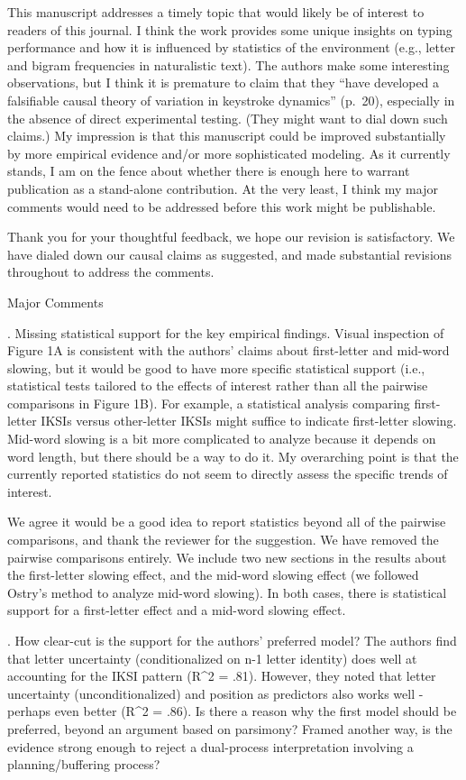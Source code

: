 \documentclass[draft]{article}
\begin{document}
\RC This manuscript addresses a timely topic that would likely be of interest to readers of this journal. I think the work provides some unique insights on typing performance and how it is influenced by statistics of the environment (e.g., letter and bigram frequencies in naturalistic text). The authors make some interesting observations, but I think it is premature to claim that they ``have developed a falsifiable causal theory of variation in keystroke dynamics'' (p.~20), especially in the absence of direct experimental testing. (They might want to dial down such claims.) My impression is that this manuscript could be improved substantially by more empirical evidence and/or more sophisticated modeling. As it currently stands, I am on the fence about whether there is enough here to warrant publication as a stand-alone contribution. At the very least, I think my major comments would need to be addressed before this work might be publishable.

Thank you for your thoughtful feedback, we hope our revision is satisfactory. We have dialed down our causal claims as suggested, and made substantial revisions throughout to address the comments.

Major Comments

. Missing statistical support for the key empirical findings. Visual inspection of Figure 1A is consistent with the authors' claims about first-letter and mid-word slowing, but it would be good to have more specific statistical support (i.e., statistical tests tailored to the effects of interest rather than all the pairwise comparisons in Figure 1B). For example, a statistical analysis comparing first-letter IKSIs versus other-letter IKSIs might suffice to indicate first-letter slowing. Mid-word slowing is a bit more complicated to analyze because it depends on word length, but there should be a way to do it. My overarching point is that the currently reported statistics do not seem to directly assess the specific trends of interest.

We agree it would be a good idea to report statistics beyond all of the pairwise comparisons, and thank the reviewer for the suggestion. We have removed the pairwise comparisons entirely. We include two new sections in the results about the first-letter slowing effect, and the mid-word slowing effect (we followed Ostry's method to analyze mid-word slowing). In both cases, there is statistical support for a first-letter effect and a mid-word slowing effect.

. How clear-cut is the support for the authors' preferred model? The authors find that letter uncertainty (conditionalized on n-1 letter identity) does well at accounting for the IKSI pattern (R\^{}2 = .81). However, they noted that letter uncertainty (unconditionalized) and position as predictors also works well - perhaps even better (R\^{}2 = .86). Is there a reason why the first model should be preferred, beyond an argument based on parsimony? Framed another way, is the evidence strong enough to reject a dual-process interpretation involving a planning/buffering process?
\end{document}
